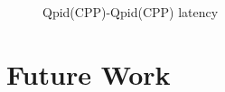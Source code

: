 \documentclass{thesis}
\begin{document}
\begin{figure}[tb] 
\centering
\caption{Qpid(CPP)-Qpid(CPP) latency}
\label{qpid-qpid-latency}
\end{figure}

\chapter{Future Work}


\begin{singlespace}

{}
\end{singlespace}
\end{document}

